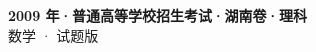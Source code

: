 \documentclass[zihao=-4, a4paper]{ctexart}
\begin{document}
\begin{center}
  {\Large\bfseries 2009 年·普通高等学校招生考试·湖南卷·理科}\\[4pt]
  {\large 数学 · 试题版}
\end{center}
\medskip
{}

\end{document}
